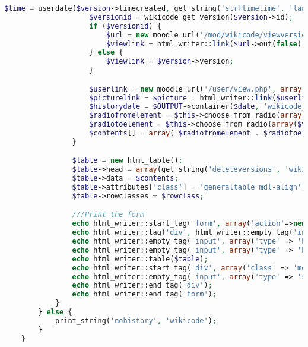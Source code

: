 \begin{lstlisting}[language=PHP]
                    $time = userdate($version->timecreated, get_string('strftimetime', 'langconfig'));
                    $versionid = wikicode_get_version($version->id);
                    if ($versionid) {
                        $url = new moodle_url('/mod/wikicode/viewversion.php', array('pageid' => $pageid, 'versionid' => $versionid->id));
                        $viewlink = html_writer::link($url->out(false), $version->version);
                    } else {
                        $viewlink = $version->version;
                    }

                    $userlink = new moodle_url('/user/view.php', array('id' => $version->userid));
                    $picturelink = $picture . html_writer::link($userlink->out(false), fullname($user));
                    $historydate = $OUTPUT->container($date, 'wikicode_histdate');
                    $radiofromelement = $this->choose_from_radio(array($version->version  => null), 'fromversion', 'M.mod_wikicode.deleteversion()', $versioncount, true);
                    $radiotoelement = $this->choose_from_radio(array($version->version  => null), 'toversion', 'M.mod_wikicode.deleteversion()', $versioncount, true);
                    $contents[] = array( $radiofromelement . $radiotoelement, $viewlink, $picturelink, $time, $historydate);
                }

                $table = new html_table();
                $table->head = array(get_string('deleteversions', 'wikicode'), get_string('version'), get_string('user'), get_string('modified'), '');
                $table->data = $contents;
                $table->attributes['class'] = 'generaltable mdl-align';
                $table->rowclasses = $rowclass;

                ///Print the form
                echo html_writer::start_tag('form', array('action'=>new moodle_url('/mod/wikicode/admin.php'), 'method' => 'post'));
                echo html_writer::tag('div', html_writer::empty_tag('input', array('type' => 'hidden', 'name' => 'pageid', 'value' => $pageid)));
                echo html_writer::empty_tag('input', array('type' => 'hidden', 'name' => 'option', 'value' => $this->view));
                echo html_writer::empty_tag('input', array('type' => 'hidden', 'name' => 'sesskey', 'value' =>  sesskey()));
                echo html_writer::table($table);
                echo html_writer::start_tag('div', array('class' => 'mdl-align'));
                echo html_writer::empty_tag('input', array('type' => 'submit', 'class' => 'wikicode_form-button', 'value' => get_string('deleteversions', 'wikicode')));
                echo html_writer::end_tag('div');
                echo html_writer::end_tag('form');
            }
        } else {
            print_string('nohistory', 'wikicode');
        }
    }


\end{lstlisting}
